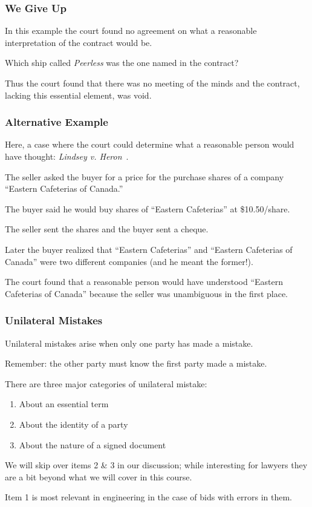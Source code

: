 \begin{frame}
\frametitle{We Give Up}

In this example the court found no agreement on what a reasonable interpretation of the contract would be.

Which ship called \textit{Peerless} was the one named in the contract?

Thus the court found that there was no meeting of the minds and the contract, lacking this essential element, was void.


\end{frame}



\begin{frame}
\frametitle{Alternative Example}

Here, a case where the court could determine what a reasonable person would have thought: \textit{Lindsey v. Heron}~\cite{lba}.

The seller asked the buyer for a price for the purchase shares of a company ``Eastern Cafeterias of Canada.''

The buyer said he would buy shares of ``Eastern Cafeterias'' at \$10.50/share.

The seller sent the shares and the buyer sent a cheque.

Later the buyer realized that ``Eastern Cafeterias'' and ``Eastern Cafeterias of Canada'' were two different companies (and he meant the former!).

The court found that a reasonable person would have understood ``Eastern Cafeterias of Canada'' because the seller was unambiguous in the first place.

\end{frame}



\begin{frame}
\frametitle{Unilateral Mistakes}

Unilateral mistakes arise when only one party has made a mistake. 

Remember: the other party must know the first party made a mistake.

There are three major categories of unilateral mistake:

\begin{enumerate}
	\item About an essential term
	\item About the identity of a party 
	\item About the nature of a signed document
\end{enumerate}

We will skip over items 2 \& 3 in our discussion; while interesting for lawyers they are a bit beyond what we will cover in this course.

Item 1 is most relevant in engineering in the case of bids with errors in them.

\end{frame}



